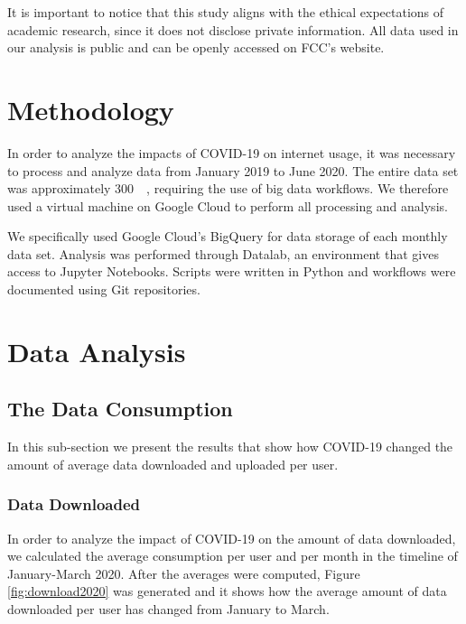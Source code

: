 \documentclass[conference,10pt]{IEEEtran}
\begin{document}
It is important to notice that this study aligns with the ethical expectations of academic research, since it does not disclose private information. All data used in our analysis is public and can be openly accessed on FCC's website.

\section{Methodology}
\label{sec:methodology}

In order to analyze the impacts of COVID-19 on internet usage, it was necessary to process and analyze data from January 2019 to June 2020. The entire data set was approximately \SI{300}{\giga\byte}, requiring the use of big data workflows. We therefore used a virtual machine on Google Cloud to perform all processing and analysis.

We specifically used Google Cloud's BigQuery for data storage of each monthly data set. Analysis was performed through Datalab, an environment that gives access to Jupyter Notebooks. Scripts were written in Python and workflows were documented using Git repositories. 



\section{Data Analysis}
\label{sec:data-analysis}




\subsection{The Data Consumption}
\label{sec:the-data-consumption}
In this sub-section we present the results that show how COVID-19 changed the amount of average data downloaded and uploaded per user.

\subsubsection{Data Downloaded}
\label{sec:download-data-consumption}

In order to analyze the impact of COVID-19 on the amount of data downloaded, we calculated the average consumption per user and per month in the timeline of January-March 2020. After the averages were computed, Figure \ref{fig:download2020} was generated and it shows how the average amount of data downloaded per user has changed from January to March.
\end{document}
